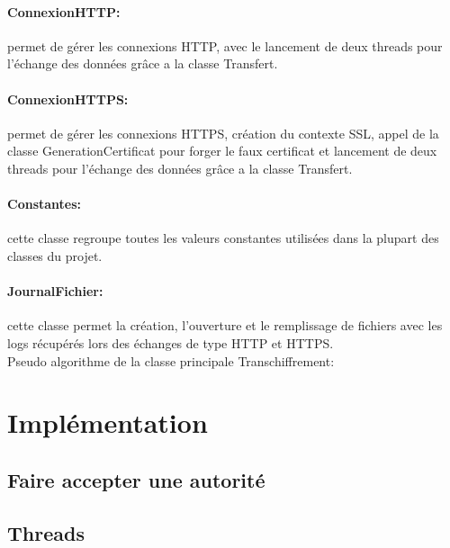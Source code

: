 \documentclass[a4paper,11pt,french]{report}
\begin{document}
	\paragraph{ConnexionHTTP:} permet de gérer les connexions HTTP, avec le lancement
	de deux threads pour l'échange des données grâce a la classe Transfert.
	\paragraph{ConnexionHTTPS:} permet de gérer les connexions HTTPS, création du contexte SSL, appel de la classe
	GenerationCertificat pour forger le faux certificat et lancement de deux threads pour l'échange des données grâce a la classe Transfert.
	\paragraph{Constantes:} cette classe regroupe toutes les valeurs constantes
	utilisées dans la plupart des classes du projet.
	\paragraph{JournalFichier:} cette classe permet la création, l'ouverture et le remplissage
	de fichiers avec les logs récupérés lors des échanges de type HTTP et HTTPS.
~~\\

Pseudo algorithme de la classe principale Transchiffrement:~~\\




\section{Implémentation}
\subsection{Faire accepter une autorité}


\subsection{Threads}
\end{document}
